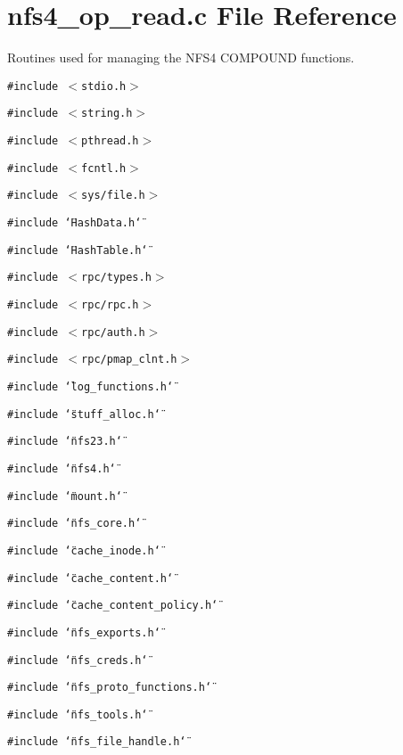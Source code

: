 \section{nfs4\_\-op\_\-read.c File Reference}
\label{nfs4__op__read_8c}
Routines used for managing the NFS4 COMPOUND functions. 

{\tt \#include $<$stdio.h$>$}\par
{\tt \#include $<$string.h$>$}\par
{\tt \#include $<$pthread.h$>$}\par
{\tt \#include $<$fcntl.h$>$}\par
{\tt \#include $<$sys/file.h$>$}\par
{\tt \#include \char`\"{}Hash\-Data.h\char`\"{}}\par
{\tt \#include \char`\"{}Hash\-Table.h\char`\"{}}\par
{\tt \#include $<$rpc/types.h$>$}\par
{\tt \#include $<$rpc/rpc.h$>$}\par
{\tt \#include $<$rpc/auth.h$>$}\par
{\tt \#include $<$rpc/pmap\_\-clnt.h$>$}\par
{\tt \#include \char`\"{}log\_\-functions.h\char`\"{}}\par
{\tt \#include \char`\"{}stuff\_\-alloc.h\char`\"{}}\par
{\tt \#include \char`\"{}nfs23.h\char`\"{}}\par
{\tt \#include \char`\"{}nfs4.h\char`\"{}}\par
{\tt \#include \char`\"{}mount.h\char`\"{}}\par
{\tt \#include \char`\"{}nfs\_\-core.h\char`\"{}}\par
{\tt \#include \char`\"{}cache\_\-inode.h\char`\"{}}\par
{\tt \#include \char`\"{}cache\_\-content.h\char`\"{}}\par
{\tt \#include \char`\"{}cache\_\-content\_\-policy.h\char`\"{}}\par
{\tt \#include \char`\"{}nfs\_\-exports.h\char`\"{}}\par
{\tt \#include \char`\"{}nfs\_\-creds.h\char`\"{}}\par
{\tt \#include \char`\"{}nfs\_\-proto\_\-functions.h\char`\"{}}\par
{\tt \#include \char`\"{}nfs\_\-tools.h\char`\"{}}\par
{\tt \#include \char`\"{}nfs\_\-file\_\-handle.h\char`\"{}}\par
